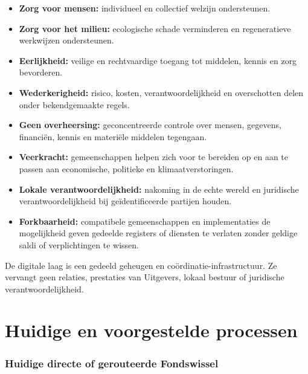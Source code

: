 \documentclass[11pt]{article}
\begin{document}
\begin{itemize}[leftmargin=*]
\item \textbf{Zorg voor mensen:} individueel en collectief welzijn ondersteunen.
\item \textbf{Zorg voor het milieu:} ecologische schade verminderen en regeneratieve werkwijzen ondersteunen.
\item \textbf{Eerlijkheid:} veilige en rechtvaardige toegang tot middelen, kennis en zorg bevorderen.
\item \textbf{Wederkerigheid:} risico, kosten, verantwoordelijkheid en overschotten delen onder bekendgemaakte regels.
\item \textbf{Geen overheersing:} geconcentreerde controle over mensen, gegevens, financiën, kennis en materiële middelen tegengaan.
\item \textbf{Veerkracht:} gemeenschappen helpen zich voor te bereiden op en aan te passen aan economische, politieke en klimaatverstoringen.
\item \textbf{Lokale verantwoordelijkheid:} nakoming in de echte wereld en juridische verantwoordelijkheid bij geïdentificeerde partijen houden.
\item \textbf{Forkbaarheid:} compatibele gemeenschappen en implementaties de mogelijkheid geven gedeelde registers of diensten te verlaten zonder geldige saldi of verplichtingen te wissen.
\end{itemize}
De digitale laag is een gedeeld geheugen en coördinatie-infrastructuur. Ze vervangt geen relaties, prestaties van Uitgevers, lokaal bestuur of juridische verantwoordelijkheid.

\section*{Huidige en voorgestelde processen}

\subsubsection*{Huidige directe of gerouteerde Fondswissel}
\end{document}
